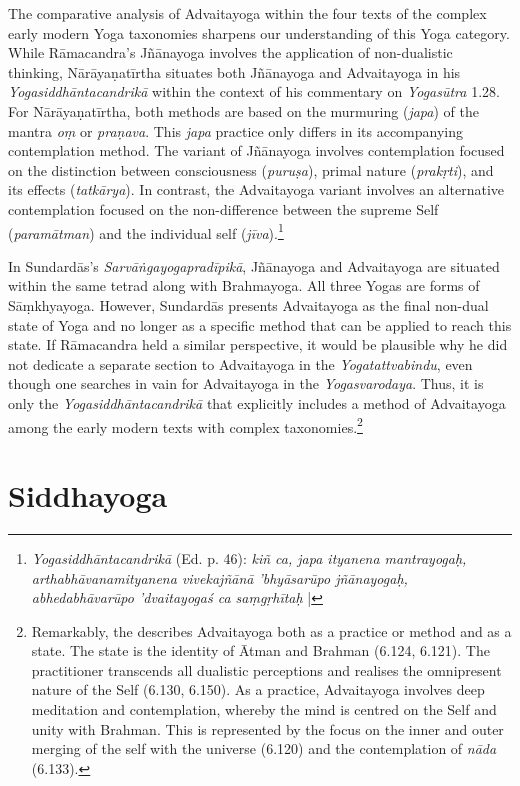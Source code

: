 The comparative analysis of Advaitayoga within the four texts of the complex early modern Yoga taxonomies sharpens our understanding of this Yoga category. While Rāmacandra’s Jñānayoga involves the application of non-dualistic thinking, Nārāyaṇatīrtha situates both Jñānayoga and Advaitayoga in his \textit{Yogasiddhāntacandrikā} within the context of his commentary on \textit{Yogasūtra} 1.28. For Nārāyaṇatīrtha, both methods are based on the murmuring (\textit{japa}) of the mantra \textit{oṃ} or \textit{praṇava}. This \textit{japa} practice only differs in its accompanying contemplation method. The variant of Jñānayoga involves contemplation focused on the distinction between consciousness (\textit{puruṣa}), primal nature (\textit{prakṛti}), and its effects (\textit{tatkārya}). In contrast, the Advaitayoga variant involves an alternative contemplation focused on the non-difference between the supreme Self (\textit{paramātman}) and the individual self (\textit{jīva}).\footnote{\emph{Yogasiddhāntacandrikā} (Ed. p. 46): \textit{kiñ ca, japa ityanena mantrayogaḥ, arthabhāvanamityanena vivekajñānā 'bhyāsarūpo jñānayogaḥ, abhedabhāvarūpo 'dvaitayogaś ca saṃgṛhītaḥ} |}

In Sundardās’s \textit{Sarvāṅgayogapradīpikā}, Jñānayoga and Advaitayoga are situated within the same tetrad along with Brahmayoga. All three Yogas are forms of Sāṃkhyayoga. However, Sundardās presents Advaitayoga as the final non-dual state of Yoga and no longer as a specific method that can be applied to reach this state. If Rāmacandra held a similar perspective, it would be plausible why he did not dedicate a separate section to Advaitayoga in the \textit{Yogatattvabindu}, even though one searches in vain for Advaitayoga in the \textit{Yogasvarodaya}. Thus, it is only the \textit{Yogasiddhāntacandrikā} that explicitly includes a method of Advaitayoga among the early modern texts with complex taxonomies.\footnote{Remarkably, the  describes Advaitayoga both as a practice or method and as a state. The state is the identity of Ātman and Brahman (6.124, 6.121). The practitioner transcends all dualistic perceptions and realises the omnipresent nature of the Self (6.130, 6.150). As a practice, Advaitayoga involves deep meditation and contemplation, whereby the mind is centred on the Self and unity with Brahman. This is represented by the focus on the inner and outer merging of the self with the universe (6.120) and the contemplation of \textit{nāda} (6.133).}   

\section{Siddhayoga}
\label{siddhayogaintro}

